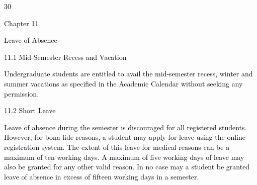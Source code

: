 \documentclass[12pt]{article}
\begin{document}
\vspace{\baselineskip}

\vspace{\baselineskip}

\vspace{\baselineskip}

\vspace{\baselineskip}

\vspace{\baselineskip}

\vspace{\baselineskip}

\vspace{\baselineskip}

\vspace{\baselineskip}
\begin{Center}
\textcolor[HTML]{00000A}{30}
\end{Center}\par


\vspace{\baselineskip}
{\fontsize{14pt}{16.8pt}\selectfont \textcolor[HTML]{00000A}{Chapter 11}\par}\par


\vspace{\baselineskip}
{\fontsize{20pt}{24.0pt}\selectfont \textcolor[HTML]{00000A}{Leave of Absence}\par}\par


\vspace{\baselineskip}
\textcolor[HTML]{00000A}{11.1 Mid-Semester Recess and Vacation}\par


\vspace{\baselineskip}
\begin{justify}
{\fontsize{10pt}{12.0pt}\selectfont \textcolor[HTML]{00000A}{Undergraduate students are entitled to avail the mid-semester recess, winter and summer vacations as specified in the Academic Calendar without seeking any permission.}\par}
\end{justify}\par


\vspace{\baselineskip}
\textcolor[HTML]{00000A}{11.2 Short Leave}\par


\vspace{\baselineskip}
\begin{justify}
{\fontsize{9pt}{10.8pt}\selectfont \textcolor[HTML]{00000A}{Leave of absence during the semester is discouraged for all registered students. However, for bona fide reasons, a student may apply for leave using the online registration system. The extent of this leave for medical reasons can be a maximum of ten working days. A maximum of five working days of leave may also be granted for any other valid reason. In no case may a student be granted leave of absence in excess of fifteen working days in a semester.}\par}
\end{justify}\par
\end{document}
